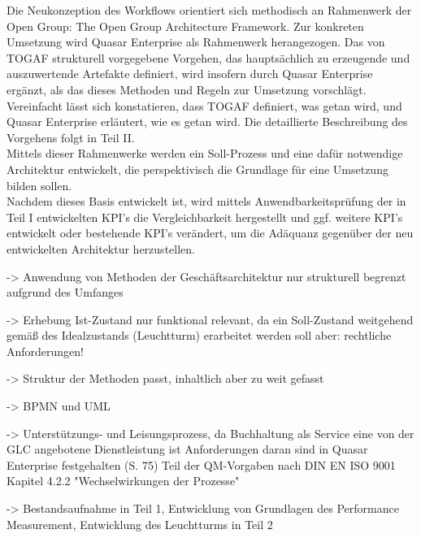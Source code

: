 Die Neukonzeption des Workflows orientiert sich methodisch an Rahmenwerk der Open Group: The Open Group Architecture Framework. 
Zur konkreten Umsetzung wird Quasar Enterprise als Rahmenwerk herangezogen. 
Das von TOGAF strukturell vorgegebene Vorgehen, das hauptsächlich zu erzeugende und auszuwertende Artefakte definiert, wird insofern durch Quasar Enterprise ergänzt, als das dieses Methoden und Regeln zur Umsetzung vorschlägt. 
Vereinfacht lässt sich konstatieren, dass TOGAF definiert, was getan wird, und Quasar Enterprise erläutert, wie es getan wird. 
Die detaillierte Beschreibung des Vorgehens folgt in Teil II.\\
Mittels dieser Rahmenwerke werden ein Soll-Prozess und eine dafür notwendige Architektur entwickelt, die perspektivisch die Grundlage für eine Umsetzung bilden sollen.\\
Nachdem dieses Basis entwickelt ist, wird mittels Anwendbarkeitsprüfung der in Teil I entwickelten KPI's die Vergleichbarkeit hergestellt und ggf. weitere KPI's entwickelt oder bestehende KPI's verändert, um die Adäquanz gegenüber der neu entwickelten Architektur herzustellen.

-> Anwendung von Methoden der Geschäftsarchitektur nur strukturell begrenzt aufgrund des Umfanges

-> Erhebung Ist-Zustand nur funktional relevant, da ein Soll-Zustand weitgehend gemäß des Idealzustands (Leuchtturm) erarbeitet werden soll
aber: rechtliche Anforderungen!

-> Struktur der Methoden passt, inhaltlich aber zu weit gefasst

-> BPMN und UML

-> Unterstützungs- und Leisungsprozess, da Buchhaltung als Service eine von der GLC angebotene Dienstleistung ist
Anforderungen daran sind in Quasar Enterprise festgehalten (S. 75)
Teil der QM-Vorgaben nach DIN EN ISO 9001 Kapitel 4.2.2 "Wechselwirkungen der Prozesse" 

-> Bestandsaufnahme in Teil 1, Entwicklung von Grundlagen des Performance Measurement, Entwicklung des Leuchtturms in Teil 2

\subsection{}